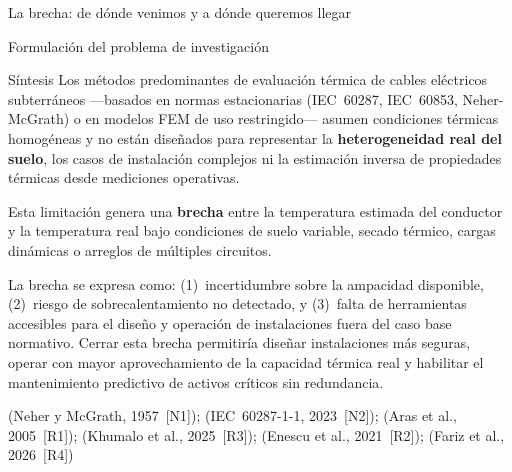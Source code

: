 \documentclass[aspectratio=169]{beamer}
\newcommand{\refcite}[1]{{\footnotesize\color{gray!70!black} #1}}
\begin{document}
\begin{frame}{La brecha: de dónde venimos y a dónde queremos llegar}
\begin{center}
{%
}
\end{center}
\end{frame}

\begin{frame}{Formulación del problema de investigación}
\begin{exampleblock}{Síntesis}
\justifying\small
Los métodos predominantes de evaluación térmica de cables eléctricos
subterráneos ---basados en normas estacionarias (IEC~60287, IEC~60853,
Neher-McGrath) o en modelos FEM de uso restringido--- asumen condiciones
térmicas homogéneas y no están diseñados para representar la
\textbf{heterogeneidad real del suelo}, los casos de instalación complejos
ni la estimación inversa de propiedades térmicas desde mediciones operativas.

\vspace{0.3em}
Esta limitación genera una \textbf{brecha} entre la temperatura estimada del
conductor y la temperatura real bajo condiciones de suelo variable, secado
térmico, cargas dinámicas o arreglos de múltiples circuitos.

\vspace{0.3em}
La brecha se expresa como: (1)~incertidumbre sobre la ampacidad disponible,
(2)~riesgo de sobrecalentamiento no detectado, y (3)~falta de herramientas
accesibles para el diseño y operación de instalaciones fuera del caso base
normativo. Cerrar esta brecha permitiría diseñar instalaciones más seguras,
operar con mayor aprovechamiento de la capacidad térmica real y habilitar el
mantenimiento predictivo de activos críticos sin redundancia.
\end{exampleblock}

\vspace{0.3em}
\refcite{(Neher y McGrath, 1957~[N1]); (IEC~60287-1-1, 2023~[N2]); (Aras et al., 2005~[R1]);
(Khumalo et al., 2025~[R3]); (Enescu et al., 2021~[R2]); (Fariz et al., 2026~[R4])}
\end{frame}
\end{document}
